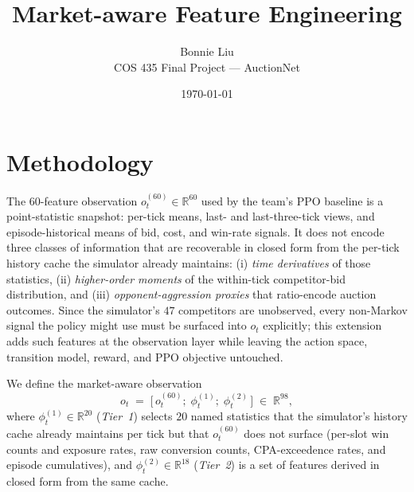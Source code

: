 \documentclass[11pt]{article}
\title{Market-aware Feature Engineering}
\author{Bonnie Liu \\ COS 435 Final Project --- AuctionNet}
\date{\today}
\begin{document}
\maketitle

\section{Methodology}

The 60-feature observation $o_t^{(60)} \in \mathbb{R}^{60}$ used by the
team's PPO baseline is a point-statistic snapshot: per-tick means, last- and
last-three-tick views, and episode-historical means of bid, cost, and
win-rate signals. It does not encode three classes of information that are
recoverable in closed form from the per-tick history cache the simulator
already maintains: (i) \emph{time derivatives} of those statistics, (ii)
\emph{higher-order moments} of the within-tick competitor-bid distribution,
and (iii) \emph{opponent-aggression proxies} that ratio-encode auction
outcomes. Since the simulator's $47$ competitors are unobserved, every
non-Markov signal the policy might use must be surfaced into $o_t$
explicitly; this extension adds such features at the observation layer
while leaving the action space, transition model, reward, and PPO
objective untouched.

We define the market-aware observation
\begin{equation}
  o_t \;=\; \big[\,o_t^{(60)};\;\phi^{(1)}_t;\;\phi^{(2)}_t\,\big]
  \;\in\;\mathbb{R}^{98},
\end{equation}
where $\phi^{(1)}_t \in \mathbb{R}^{20}$ (\emph{Tier~1}) selects $20$
named statistics that the simulator's history cache already maintains per
tick but that $o_t^{(60)}$ does not surface (per-slot win counts and
exposure rates, raw conversion counts, CPA-exceedence rates, and episode
cumulatives), and $\phi^{(2)}_t \in \mathbb{R}^{18}$ (\emph{Tier~2}) is a
set of features derived in closed form from the same cache.
\end{document}
